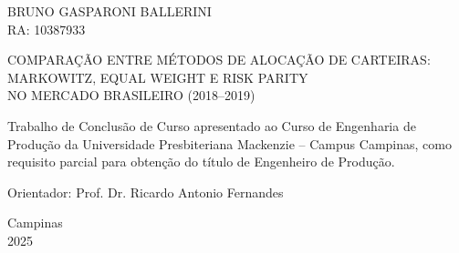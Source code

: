 
\begin{center}

{\fontsize{12}{14.4}\selectfont\MakeUppercase{BRUNO GASPARONI BALLERINI}}\\
{\fontsize{12}{14.4}\selectfont RA: 10387933}\\

\vspace{4cm}

{\fontsize{12}{14.4}\selectfont\MakeUppercase{%
COMPARAÇÃO ENTRE MÉTODOS DE ALOCAÇÃO DE CARTEIRAS:\\
MARKOWITZ, EQUAL WEIGHT E RISK PARITY\\
NO MERCADO BRASILEIRO (2018–2019)%
}}\\

\vspace{3cm}

\end{center}

\begin{flushright}
\begin{minipage}{8cm}
\fontsize{11}{13.2}\selectfont
\setlength{\parindent}{0cm}
\setlength{\parskip}{0pt}

Trabalho de Conclusão de Curso apresentado ao Curso de Engenharia de Produção da Universidade Presbiteriana Mackenzie -- Campus Campinas, como requisito parcial para obtenção do título de Engenheiro de Produção.

\vspace{1cm}

Orientador: Prof. Dr. Ricardo Antonio Fernandes

\end{minipage}
\end{flushright}

\vfill

\begin{center}
{\fontsize{12}{14.4}\selectfont
Campinas\\
2025}
\end{center}